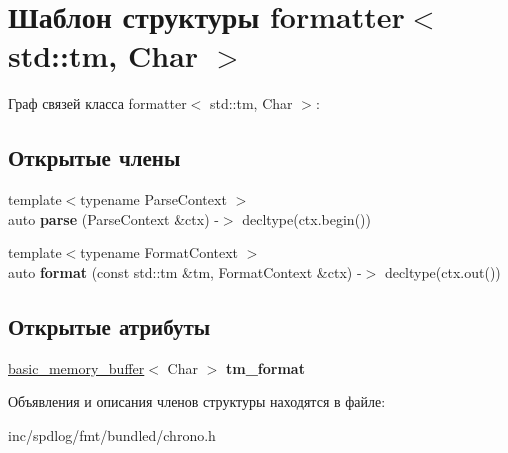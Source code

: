 \hypertarget{structformatter_3_01std_1_1tm_00_01Char_01_4}{}\section{Шаблон структуры formatter$<$ std\+:\+:tm, Char $>$}
\label{structformatter_3_01std_1_1tm_00_01Char_01_4}


Граф связей класса formatter$<$ std\+:\+:tm, Char $>$\+:
\subsection*{Открытые члены}
\begin{DoxyCompactItemize}
\item 
\mbox{\label{structformatter_3_01std_1_1tm_00_01Char_01_4_a48e18c3d8fc0bf234d6981a60828f5ca}} 
{\footnotesize template$<$typename Parse\+Context $>$ }\\auto {\bfseries parse} (Parse\+Context \&ctx) -\/$>$ decltype(ctx.\+begin())
\item 
\mbox{\label{structformatter_3_01std_1_1tm_00_01Char_01_4_ab9ede05d9788f38bfc435af29d7fefe0}} 
{\footnotesize template$<$typename Format\+Context $>$ }\\auto {\bfseries format} (const std\+::tm \&tm, Format\+Context \&ctx) -\/$>$ decltype(ctx.\+out())
\end{DoxyCompactItemize}
\subsection*{Открытые атрибуты}
\begin{DoxyCompactItemize}
\item 
\mbox{\label{structformatter_3_01std_1_1tm_00_01Char_01_4_a2a9d9612580cc86f7670f68eb150ca95}} 
\hyperlink{classbasic__memory__buffer}{basic\+\_\+memory\+\_\+buffer}$<$ Char $>$ {\bfseries tm\+\_\+format}
\end{DoxyCompactItemize}


Объявления и описания членов структуры находятся в файле\+:\begin{DoxyCompactItemize}
\item 
inc/spdlog/fmt/bundled/chrono.\+h\end{DoxyCompactItemize}
